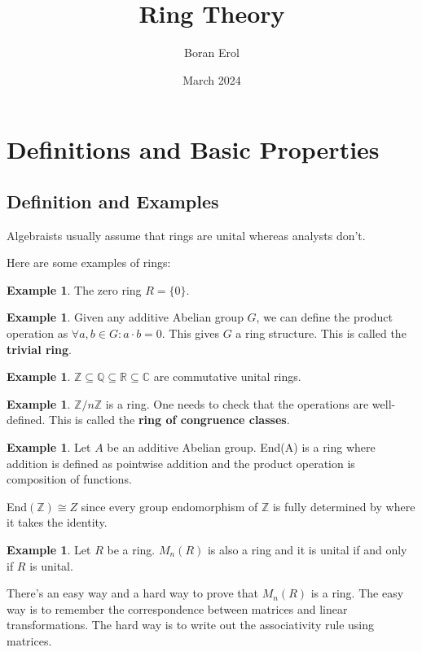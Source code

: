 \documentclass{article}
\title{Ring Theory}
\date{March 2024}
\author{Boran Erol}
\theoremstyle{definition}
\newtheorem{example}[theorem]{Example}
\newcommand{\Z}{\mathbb{Z}}
\newcommand{\R}{\mathbb{R}}
\newcommand{\Q}{\mathbb{Q}}
\newcommand{\C}{\mathbb{C}}
\begin{document}
\maketitle

\section{Definitions and Basic Properties}

\subsection{Definition and Examples}

Algebraists usually assume that rings are unital whereas analysts don't.

Here are some examples of rings:

\begin{example}
    The zero ring $R = \{ 0 \}$.
\end{example}

\begin{example}
    Given any additive Abelian group $G$, we can define the product operation as $\forall a,b \in G: a \cdot b = 0$.
    This gives $G$ a ring structure. This is called the \textbf{trivial ring}.
\end{example}

\begin{example}
    $\Z \subseteq \Q \subseteq \R \subseteq \C$ are commutative unital rings.
\end{example}

\begin{example}
    $\Z / n\Z$ is a ring. One needs to check that the operations are well-defined. This is called the 
    \textbf{ring of congruence classes}.
\end{example}

\begin{example}
    Let $A$ be an additive Abelian group. End(A) is a ring where addition is defined as
    pointwise addition and the product operation is composition of functions.
    
    End$(\Z) \cong Z$ since every group endomorphism of $\Z$ is fully determined by
    where it takes the identity.
\end{example}

\begin{example}
    Let $R$ be a ring. $M_{n}(R)$ is also a ring and it is unital if and only if $R$ is unital.

    There's an easy way and a hard way to prove that $M_{n}(R)$ is a ring. The easy way
    is to remember the correspondence between matrices and linear transformations. The hard
    way is to write out the associativity rule using matrices.
\end{example}
\end{document}
